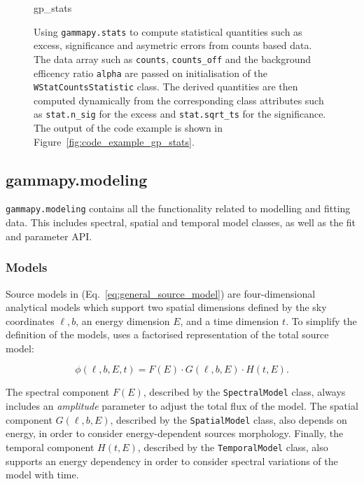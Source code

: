 \documentclass[longauth]{aa}
\newcommand{\code}[1]{\texttt{#1}}
\begin{document}
\begin{figure}
	\small
	{gp_stats}
	\caption{
        Using \code{gammapy.stats} to compute statistical quantities
        such as excess, significance and asymetric errors
        from counts based data. The data array such as \code{counts}, \code{counts\_off}
		and the background efficency ratio \code{alpha} are passed on initialisation
        of the \code{WStatCountsStatistic} class. The derived quantities
        are then computed dynamically from the corresponding class
        attributes such as \code{stat.n\_sig} for the excess
		and \code{stat.sqrt\_ts} for the significance.
		The output of the code example is shown in Figure~\ref{fig:code_example_gp_stats}.
    }
	\label{fig*:minted:gp_stats}
\end{figure}

\subsection{gammapy.modeling}
\label{ssec:gammapy-modeling}
%
\code{gammapy.modeling} contains all the functionality related to modelling and fitting
data. This includes spectral, spatial and temporal model classes, as well as
the fit and parameter API.

\subsubsection{Models}
\label{sssec:models}
Source models in \gammapy (Eq.~\ref{eq:general_source_model}) are four-dimensional 
analytical models which support two spatial dimensions defined by the sky coordinates
$\ell, b$, an energy dimension $E$, and a time dimension $t$. To simplify the definition of the
models, \gammapy uses a factorised representation of the total source
model:

\begin{equation}
    \phi(\ell, b, E, t) = F(E) \cdot G(\ell, b, E) \cdot H(t, E).
    \label{eq:source_model_dependency}
\end{equation}

The spectral component $F(E)$, described by the \code{SpectralModel} class, always
includes an \textit{amplitude} parameter to adjust the total flux of the model.
The spatial component $G(\ell, b, E)$, described by the \code{SpatialModel} class,
also depends on energy, in order to consider energy-dependent sources morphology.
Finally, the temporal component $H(t, E)$, described by the \code{TemporalModel}
class, also supports an energy dependency in order to consider spectral variations
of the model with time.
\end{document}
